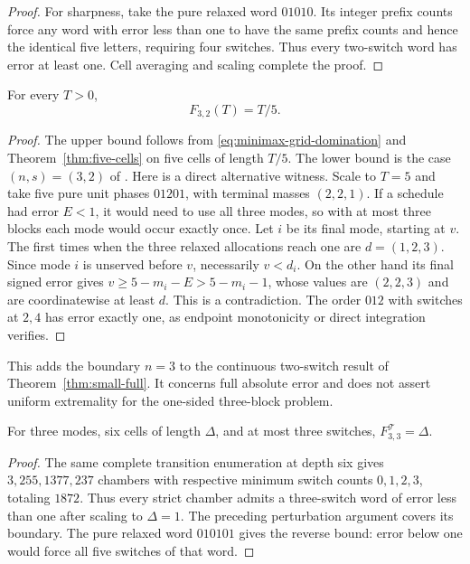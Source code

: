 \begin{proof}
For sharpness, take the pure relaxed word $01010$. Its integer prefix
counts force any word with error less than one to have the same prefix
counts and hence the identical five letters, requiring four switches.
Thus every two-switch word has error at least one. Cell averaging and
scaling complete the proof.
\end{proof}

\begin{corollary}\label{cor:three-two-continuous}
For every $T>0$,
\begin{equation}\label{eq:three-two-continuous}
 F_{3,2}(T)=T/5.
\end{equation}
\end{corollary}
\begin{proof}
The upper bound follows from \eqref{eq:minimax-grid-domination} and
Theorem~\ref{thm:five-cells} on five cells of length $T/5$.
The lower bound is the case $(n,s)=(3,2)$ of
\citet[Proposition~4, p.~612, equation~(7.4)]{sager-zeile2021}.
Here is a direct alternative witness. Scale to $T=5$ and take five pure
unit phases $01201$, with terminal masses $(2,2,1)$.
If a schedule had error $E<1$, it would need to use all three modes,
so with at most three blocks each mode would occur exactly once.
Let $i$ be its final mode, starting at $v$.
The first times when the three relaxed allocations reach one are
$d=(1,2,3)$. Since mode $i$ is unserved before $v$, necessarily
$v<d_i$. On the other hand its final signed error gives
$v\ge5-m_i-E>5-m_i-1$, whose values are $(2,2,3)$ and are
coordinatewise at least $d$. This is a contradiction.
The order $012$ with switches at $2,4$ has error exactly one,
as endpoint monotonicity or direct integration verifies.
\end{proof}
This adds the boundary $n=3$ to the continuous two-switch result of
Theorem~\ref{thm:small-full}. It concerns full absolute error and does
not assert uniform extremality for the one-sided three-block problem.

\begin{corollary}\label{cor:six-cells}
For three modes, six cells of length $\Delta$, and at most three switches,
$F^{\mathcal T}_{3,3}=\Delta$.
\end{corollary}
\begin{proof}
The same complete transition enumeration at depth six gives
$3,255,1377,237$ chambers with respective minimum switch counts
$0,1,2,3$, totaling $1872$. Thus every strict chamber admits a
three-switch word of error less than one after scaling to $\Delta=1$.
The preceding perturbation argument covers its boundary.
The pure relaxed word $010101$ gives the reverse bound: error below one
would force all five switches of that word.
\end{proof}

